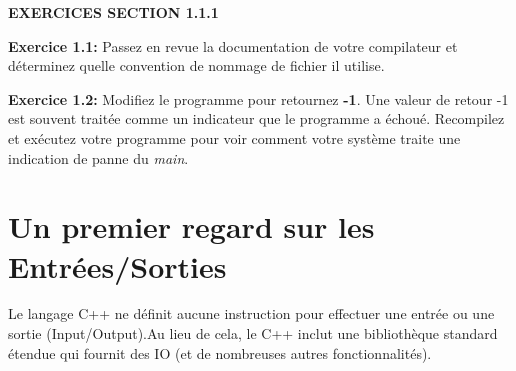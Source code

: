 \textbf{EXERCICES SECTION 1.1.1}
\begin{shadebox}
	
	\textbf{Exercice 1.1: }Passez en revue la documentation de votre compilateur et déterminez quelle convention de nommage de fichier il utilise.
	
	\textbf{Exercice 1.2: }Modifiez le programme pour retournez \textbf{-1}. Une valeur de retour -1 est souvent traitée comme un indicateur que le programme a échoué. Recompilez et exécutez votre programme pour voir comment votre système traite une indication de panne du \textit{main}.
\end{shadebox} 

\section{Un premier regard sur les Entrées/Sorties}

Le langage C++ ne définit aucune instruction pour effectuer une entrée ou une sortie (Input/Output).Au lieu de cela, le C++ inclut une bibliothèque standard étendue qui fournit des IO (et de nombreuses autres fonctionnalités).